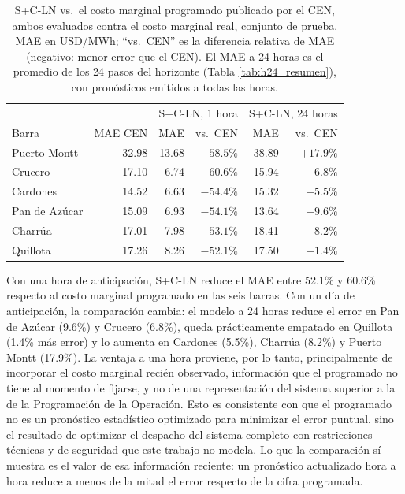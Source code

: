 \begin{table}[htbp]
    \centering
    \begin{tabular}{lrrrrr}
        \toprule
        & & \multicolumn{2}{c}{S+C-LN, 1 hora} & \multicolumn{2}{c}{S+C-LN, 24 horas} \\
        Barra & MAE CEN & MAE & vs.\ CEN & MAE & vs.\ CEN \\
        \midrule
        Puerto Montt  & 32.98 & 13.68 & $-58.5\%$ & 38.89 & $+17.9\%$ \\
        Crucero       & 17.10 & 6.74  & $-60.6\%$ & 15.94 & $-6.8\%$  \\
        Cardones      & 14.52 & 6.63  & $-54.4\%$ & 15.32 & $+5.5\%$  \\
        Pan de Azúcar & 15.09 & 6.93  & $-54.1\%$ & 13.64 & $-9.6\%$  \\
        Charrúa       & 17.01 & 7.98  & $-53.1\%$ & 18.41 & $+8.2\%$  \\
        Quillota      & 17.26 & 8.26  & $-52.1\%$ & 17.50 & $+1.4\%$  \\
        \bottomrule
    \end{tabular}
    \caption{S+C-LN vs.\ el costo marginal programado publicado por el CEN, ambos evaluados contra el costo marginal real, conjunto de prueba. MAE en USD/MWh; ``vs.\ CEN'' es la diferencia relativa de MAE (negativo: menor error que el CEN). El MAE a 24 horas es el promedio de los 24 pasos del horizonte (Tabla \ref{tab:h24_resumen}), con pronósticos emitidos a todas las horas.}
    \label{tab:cen_programado}
\end{table}

Con una hora de anticipación, S+C-LN reduce el MAE entre 52.1\% y 60.6\% respecto al costo marginal programado en las seis barras. Con un día de anticipación, la comparación cambia: el modelo a 24 horas reduce el error en Pan de Azúcar (9.6\%) y Crucero (6.8\%), queda prácticamente empatado en Quillota (1.4\% más error) y lo aumenta en Cardones (5.5\%), Charrúa (8.2\%) y Puerto Montt (17.9\%). La ventaja a una hora proviene, por lo tanto, principalmente de incorporar el costo marginal recién observado, información que el programado no tiene al momento de fijarse, y no de una representación del sistema superior a la de la Programación de la Operación. Esto es consistente con que el programado no es un pronóstico estadístico optimizado para minimizar el error puntual, sino el resultado de optimizar el despacho del sistema completo con restricciones técnicas y de seguridad que este trabajo no modela. Lo que la comparación sí muestra es el valor de esa información reciente: un pronóstico actualizado hora a hora reduce a menos de la mitad el error respecto de la cifra programada.